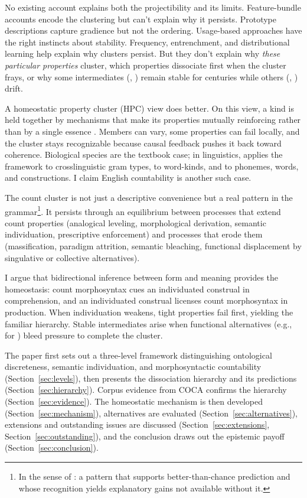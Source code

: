 \documentclass[12pt,a4paper]{article}
\begin{document}
No existing account explains both the projectibility and its limits. Feature-bundle accounts \citep{chomsky1965,allan1980} encode the clustering but can't explain why it persists. Prototype descriptions \citep{taylor2003,aarts2007} capture gradience but not the ordering. Usage-based approaches have the right instincts about stability. Frequency, entrenchment, and distributional learning help explain why clusters persist. But they don't explain why \textit{these particular properties} cluster, which properties dissociate first when the cluster frays, or why some intermediates (, ) remain stable for centuries while others (, ) drift.

A homeostatic property cluster (HPC) view does better. On this view, a kind is held together by mechanisms that make its properties mutually reinforcing rather than by a single essence \citep{boyd1991,khalidi2013}. Members can vary, some properties can fail locally, and the cluster stays recognizable because causal feedback pushes it back toward coherence. Biological species are the textbook case; in linguistics, \textcite{dahl2016} applies the framework to crosslinguistic gram types, \textcite{miller2021} to word-kinds, and \textcite{reynolds2025stack} to phonemes, words, and constructions. I claim English countability is another such case.

The count cluster is not just a descriptive convenience but a real pattern in the grammar\footnote{In the sense of \textcite{dennett1991}: a pattern that supports better-than-chance prediction and whose recognition yields explanatory gains not available without it.}. It persists through an equilibrium between processes that extend count properties (analogical leveling, morphological derivation, semantic individuation, prescriptive enforcement) and processes that erode them (massification, paradigm attrition, semantic bleaching, functional displacement by singulative or collective alternatives).

I argue that bidirectional inference between form and meaning provides the homeostasis: count morphosyntax cues an individuated construal in comprehension, and an individuated construal licenses count morphosyntax in production. When individuation weakens, tight properties fail first, yielding the familiar hierarchy. Stable intermediates arise when functional alternatives (e.g.,  for ) bleed pressure to complete the cluster.

The paper first sets out a three-level framework distinguishing ontological discreteness, semantic individuation, and morphosyntactic countability (Section~\ref{sec:levels}), then presents the dissociation hierarchy and its predictions (Section~\ref{sec:hierarchy}). Corpus evidence from COCA confirms the hierarchy (Section~\ref{sec:evidence}). The homeostatic mechanism is then developed (Section~\ref{sec:mechanism}), alternatives are evaluated (Section~\ref{sec:alternatives}), extensions and outstanding issues are discussed (Section~\ref{sec:extensions}, Section~\ref{sec:outstanding}), and the conclusion draws out the epistemic payoff (Section~\ref{sec:conclusion}).
\end{document}
